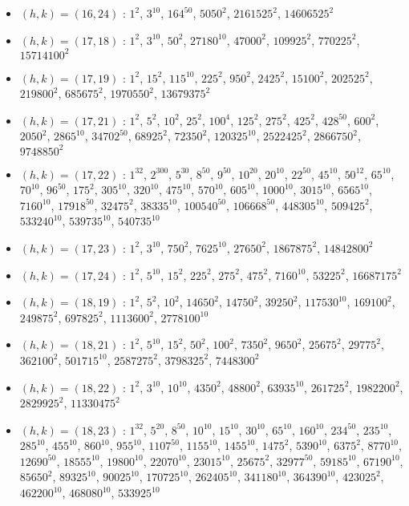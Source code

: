 \begin{itemize}
\item $(h,k)=(16,24)$ : $1^{2}$, $3^{10}$, $164^{50}$, $5050^{2}$, $2161525^{2}$, $14606525^{2}$
\item $(h,k)=(17,18)$ : $1^{2}$, $3^{10}$, $50^{2}$, $27180^{10}$, $47000^{2}$, $109925^{2}$, $770225^{2}$, $15714100^{2}$
\item $(h,k)=(17,19)$ : $1^{2}$, $15^{2}$, $115^{10}$, $225^{2}$, $950^{2}$, $2425^{2}$, $15100^{2}$, $202525^{2}$, $219800^{2}$, $685675^{2}$, $1970550^{2}$, $13679375^{2}$
\item $(h,k)=(17,21)$ : $1^{2}$, $5^{2}$, $10^{2}$, $25^{2}$, $100^{4}$, $125^{2}$, $275^{2}$, $425^{2}$, $428^{50}$, $600^{2}$, $2050^{2}$, $2865^{10}$, $34702^{50}$, $68925^{2}$, $72350^{2}$, $120325^{10}$, $2522425^{2}$, $2866750^{2}$, $9748850^{2}$
\item $(h,k)=(17,22)$ : $1^{32}$, $2^{300}$, $5^{30}$, $8^{50}$, $9^{50}$, $10^{20}$, $20^{10}$, $22^{50}$, $45^{10}$, $50^{12}$, $65^{10}$, $70^{10}$, $96^{50}$, $175^{2}$, $305^{10}$, $320^{10}$, $475^{10}$, $570^{10}$, $605^{10}$, $1000^{10}$, $3015^{10}$, $6565^{10}$, $7160^{10}$, $17918^{50}$, $32475^{2}$, $38335^{10}$, $100540^{50}$, $106668^{50}$, $448305^{10}$, $509425^{2}$, $533240^{10}$, $539735^{10}$, $540735^{10}$
\item $(h,k)=(17,23)$ : $1^{2}$, $3^{10}$, $750^{2}$, $7625^{10}$, $27650^{2}$, $1867875^{2}$, $14842800^{2}$
\item $(h,k)=(17,24)$ : $1^{2}$, $5^{10}$, $15^{2}$, $225^{2}$, $275^{2}$, $475^{2}$, $7160^{10}$, $53225^{2}$, $16687175^{2}$
\item $(h,k)=(18,19)$ : $1^{2}$, $5^{2}$, $10^{2}$, $14650^{2}$, $14750^{2}$, $39250^{2}$, $117530^{10}$, $169100^{2}$, $249875^{2}$, $697825^{2}$, $1113600^{2}$, $2778100^{10}$
\item $(h,k)=(18,21)$ : $1^{2}$, $5^{10}$, $15^{2}$, $50^{2}$, $100^{2}$, $7350^{2}$, $9650^{2}$, $25675^{2}$, $29775^{2}$, $362100^{2}$, $501715^{10}$, $2587275^{2}$, $3798325^{2}$, $7448300^{2}$
\item $(h,k)=(18,22)$ : $1^{2}$, $3^{10}$, $10^{10}$, $4350^{2}$, $48800^{2}$, $63935^{10}$, $261725^{2}$, $1982200^{2}$, $2829925^{2}$, $11330475^{2}$
\item $(h,k)=(18,23)$ : $1^{32}$, $5^{20}$, $8^{50}$, $10^{10}$, $15^{10}$, $30^{10}$, $65^{10}$, $160^{10}$, $234^{50}$, $235^{10}$, $285^{10}$, $455^{10}$, $860^{10}$, $955^{10}$, $1107^{50}$, $1155^{10}$, $1455^{10}$, $1475^{2}$, $5390^{10}$, $6375^{2}$, $8770^{10}$, $12690^{50}$, $18555^{10}$, $19800^{10}$, $22070^{10}$, $23015^{10}$, $25675^{2}$, $32977^{50}$, $59185^{10}$, $67190^{10}$, $85650^{2}$, $89325^{10}$, $90025^{10}$, $170725^{10}$, $262405^{10}$, $341180^{10}$, $364390^{10}$, $423025^{2}$, $462200^{10}$, $468080^{10}$, $533925^{10}$

\end{itemize}
